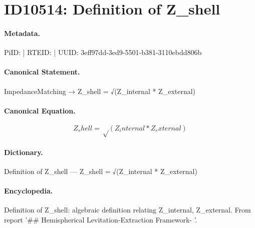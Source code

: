 \section*{ID10514: Definition of Z\_shell}
\paragraph{Metadata.}
PiID:  | RTEID:  | UUID: 3eff97dd-3ed9-5501-b381-3110ebdd806b

\paragraph{Canonical Statement.}
ImpedanceMatching → Z\_shell = √(Z\_internal * Z\_external)

\paragraph{Canonical Equation.}
\[
Z_shell = √(Z_internal * Z_external)
\]

\paragraph{Dictionary.}
Definition of Z\_shell — Z\_shell = √(Z\_internal * Z\_external)

\paragraph{Encyclopedia.}
Definition of Z\_shell: algebraic definition relating Z\_internal, Z\_external. From report '\#\# Hemispherical Levitation-Extraction Framework- '.
